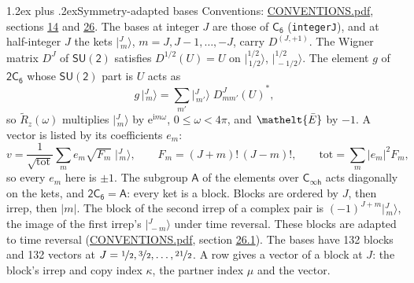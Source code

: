 \documentclass[10pt,a4paper]{article}
\makeatletter
\renewcommand\section{\@startsection{section}{1}{\z@}{-3ex plus -1ex minus -.2ex}%
  {1.2ex plus .2ex}{\normalfont\large\sffamily\bfseries\color{parttitle}}}
\numberwithin{equation}{section}
\newcommand{\eltfont}[1]{{\let\sigma\eltsigma\mathelt{#1}}}
\newcommand{\grp}[1]{\mathsf{#1}}
\newcommand{\elt}[1]{\eltfont{#1}}
\newcommand{\iunit}{\mathrm{i}}
\newcommand{\expe}{\mathrm{e}}
\newcommand{\irrJp}[2]{D^{(#1,#2)}}
\newcommand{\wignerD}[1]{D^{#1}}
\newcommand{\conj}[1]{{#1}^{*}}
\newcommand{\mult}{\kappa}
\newcommand{\intx}{\mu}
\newcommand{\jm}[2]{\bigl\lvert{}^{#1}_{\,#2}\bigr\rangle}
\newcommand{\barred}[1]{\bar{#1}}
\newcommand{\lift}[1]{\tilde{#1}}
\makeatother
\begin{document}
\section{Symmetry-adapted bases}\label{s:bases}
Conventions: \href{../../CONVENTIONS.pdf}{CONVENTIONS.pdf}, sections \href{../../../rotation/CONVENTIONS.pdf\#conv.14}{14} and \href{../../CONVENTIONS.pdf\#conv.26}{26}.
\leavevmode\label{n:index.m}\label{n:vector.ket}The bases at integer $J$ are those of \href{../../../rotation/data/pdf/C6.pdf}{$\grp{C_{6}}$} (\texttt{integerJ}), and at half-integer $J$ the kets $\jm{J}{m}$, $m = J, J-1, \dots, -J$, carry $\irrJp{J}{+1}$. \label{n:matrix.wigner}The Wigner matrix $\wignerD{J}$ of $\grp{SU(2)}$ satisfies $\wignerD{1/2}(U) = U$ on $\jm{1/2}{1/2}$, $\jm{1/2}{-1/2}$. The element $g$ of $\grp{2C_{6}}$ whose $\grp{SU(2)}$ part is $U$ acts as
\begin{equation}\label{e:action}g\,\jm{J}{m} = \sum_{m'} \jm{J}{m'}\; \conj{\wignerD{J}_{m m'}(U)},\end{equation}
so $\lift{R}_{z}(\omega)$ multiplies $\jm{J}{m}$ by $\expe^{\iunit m\omega}$, $0 \le \omega < 4\pi$, and $\elt{\barred{E}}$ by $-1$. \label{n:index.ketcoefficient}\label{n:vector.basis.symmetry}\label{n:index.ketweight}\label{n:index.total}A vector is listed by its coefficients $e_m$:
\begin{equation}\label{e:ket}v = \frac{1}{\sqrt{\mathrm{tot}}}\sum_m e_m\sqrt{F_m}\;\jm{J}{m},\qquad F_m = (J+m)!\,(J-m)!,\qquad \mathrm{tot} = \sum_m |e_m|^2F_m,\end{equation}
so every $e_m$ here is $\pm 1$.
\leavevmode\label{n:group.A}The subgroup $\grp{A}$ of the elements over $\grp{C_{\infty h}}$ acts diagonally on the kets, and $\grp{2C_{6}} = \grp{A}$: every ket is a block. Blocks are ordered by $J$, then irrep, then $|m|$. The block of the second irrep of a complex pair is $(-1)^{J+m}\jm{J}{m}$, the image of the first irrep's $\jm{J}{-m}$ under time reversal. These blocks are adapted to time reversal (\href{../../CONVENTIONS.pdf}{CONVENTIONS.pdf}, section \href{../../CONVENTIONS.pdf\#conv.26.1}{26.1}).
The bases have 132 blocks and 132 vectors at $J = \nicefrac{1}{2}, \nicefrac{3}{2}, \dots, \nicefrac{21}{2}$. \label{n:index.copy}\label{n:head.vector}A row gives a vector of a block at $J$: the block's irrep and copy index $\mult$, the partner index $\intx$ and the vector.
\end{document}
